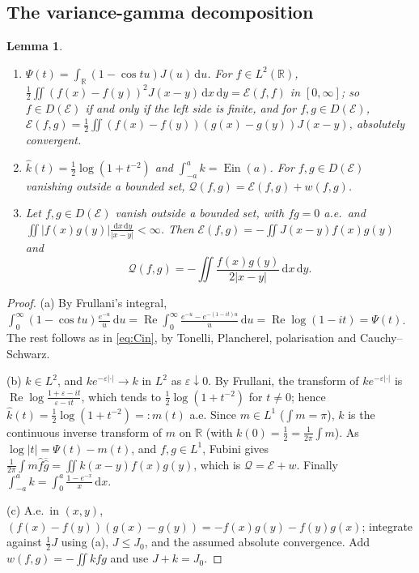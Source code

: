 \documentclass[11pt]{amsart}
\newcommand{\R}{\mathbb{R}}
\newcommand{\E}{\mathcal{E}}
\newcommand{\eps}{\varepsilon}
\newcommand{\dd}{\,\mathrm{d}}
\DeclareMathOperator{\Ein}{Ein}
\DeclareMathOperator{\re}{Re}
\newtheorem{lemma}[theorem]{Lemma}
\theoremstyle{definition}
\theoremstyle{remark}
\numberwithin{equation}{section}
\begin{document}
\subsection{The variance-gamma decomposition}

\begin{lemma}\label{lem:VG}
\begin{enumerate}
\item[(a)] $\Psi(t)=\int_\R(1-\cos tu)J(u)\dd u$. For $f\in L^2(\R)$, $\frac12\iint(f(x)-f(y))^2J(x-y)\dd x\dd y=\E(f,f)$ in $[0,\infty]$; so $f\in D(\E)$ if and only if the left side is finite, and for $f,g\in D(\E)$, $\E(f,g)=\frac12\iint(f(x)-f(y))(g(x)-g(y))J(x-y)$, absolutely convergent.
\item[(b)] $\hat k(t)=\frac12\log(1+t^{-2})$ and $\int_{-a}^ak=\Ein(a)$. For $f,g\in D(\E)$ vanishing outside a bounded set, $\mathcal Q(f,g)=\E(f,g)+w(f,g)$.
\item[(c)] Let $f,g\in D(\E)$ vanish outside a bounded set, with $fg=0$ a.e.\ and $\iint|f(x)g(y)|\frac{\dd x\dd y}{|x-y|}<\infty$. Then $\E(f,g)=-\iint J(x-y)f(x)g(y)$ and
\[
\mathcal Q(f,g)=-\iint\frac{f(x)g(y)}{2|x-y|}\dd x\dd y .
\]
\end{enumerate}
\end{lemma}

\begin{proof}
(a) By Frullani's integral, $\int_0^\infty(1-\cos tu)\frac{e^{-u}}u\dd u=\re\int_0^\infty\frac{e^{-u}-e^{-(1-it)u}}u\dd u=\re\log(1-it)=\Psi(t)$. The rest follows as in \eqref{eq:Cin}, by Tonelli, Plancherel, polarisation and Cauchy--Schwarz.

(b) $k\in L^2$, and $ke^{-\eps|\cdot|}\to k$ in $L^2$ as $\eps\downarrow0$. By Frullani, the transform of $ke^{-\eps|\cdot|}$ is $\re\log\frac{1+\eps-it}{\eps-it}$, which tends to $\frac12\log(1+t^{-2})$ for $t\ne0$; hence $\hat k(t)=\frac12\log(1+t^{-2})=:m(t)$ a.e. Since $m\in L^1$ ($\int m=\pi$), $k$ is the continuous inverse transform of $m$ on $\R$ (with $k(0)=\frac12=\frac1{2\pi}\int m$). As $\log|t|=\Psi(t)-m(t)$, and $f,g\in L^1$, Fubini gives $\frac1{2\pi}\int m\hat f\overline{\hat g}=\iint k(x-y)f(x)g(y)$, which is $\mathcal Q=\E+w$. Finally $\int_{-a}^ak=\int_0^a\frac{1-e^{-x}}x\dd x$.

(c) A.e.\ in $(x,y)$, $(f(x)-f(y))(g(x)-g(y))=-f(x)g(y)-f(y)g(x)$; integrate against $\frac12J$ using (a), $J\le J_0$, and the assumed absolute convergence. Add $w(f,g)=-\iint kfg$ and use $J+k=J_0$.
\end{proof}
\end{document}
